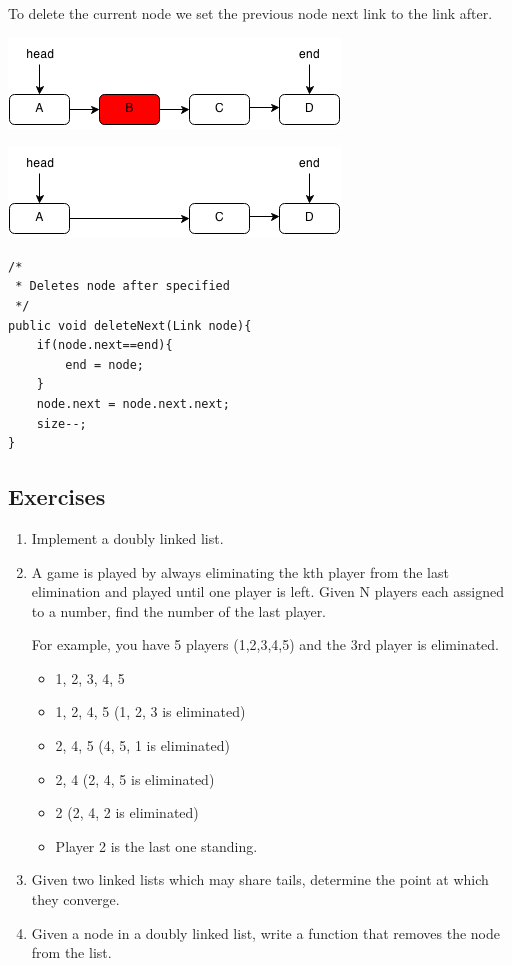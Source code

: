 \documentclass[11pt,oneside]{book}
\makeatletter
\def\maxwidth#1{\ifdim\Gin@nat@width>#1 #1\else\Gin@nat@width\fi}
\makeatother
\begin{document}
To delete the current node we set the previous node next link to the link after.

\vspace{5px}\includegraphics[width=\maxwidth{\textwidth}]{linkedlistrem.png}

\vspace{5px}\includegraphics[width=\maxwidth{\textwidth}]{linkedlistrem2.png}

\begin{lstlisting}
/*
 * Deletes node after specified
 */
public void deleteNext(Link node){
    if(node.next==end){
        end = node;
    }
    node.next = node.next.next;
    size--;
}
\end{lstlisting}

\subsection{Exercises}

\begin{enumerate}
\item Implement a doubly linked list.
\item A game is played by always eliminating the kth player from the last elimination and played until one player is left. Given N players each assigned to a number, find the number of the last player.

For example, you have 5 players (1,2,3,4,5) and the 3rd player is eliminated.

\begin{itemize}
\item 1, 2, 3, 4, 5 
\item 1, 2, 4, 5 (1, 2, 3 is eliminated)
\item 2, 4, 5 (4, 5, 1 is eliminated)
\item 2, 4 (2, 4, 5 is eliminated)
\item 2 (2, 4, 2 is eliminated)
\item Player 2 is the last one standing.
\end{itemize}
\item Given two linked lists which may share tails, determine the point at which they converge.
\item Given a node in a doubly linked list, write a function that removes the node from the list. 
\end{enumerate}
\end{document}
